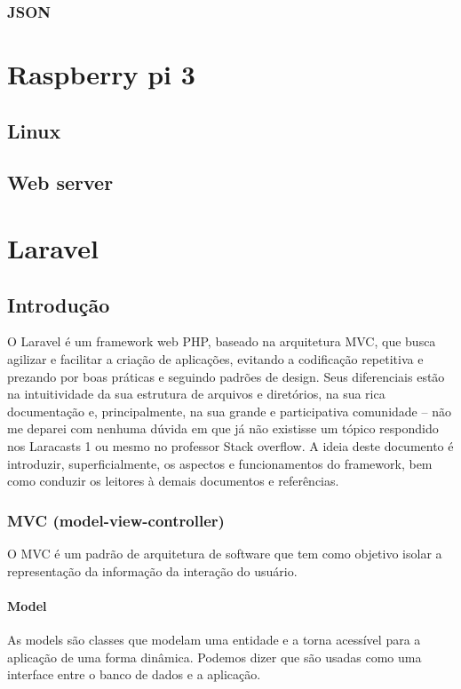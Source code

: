 \documentclass[
12pt,				%
openany,			%
twoside,			%
a4paper,			%
english,			%
french,				%
spanish,			%
brazil,				%
]{abntex2}
\begin{document}
\subsection{JSON}

\chapter{Raspberry pi 3}

\section{Linux}

\section{Web server}



\chapter{Laravel}
\section{Introdução}
O Laravel é um framework web PHP, baseado na arquitetura MVC, que busca agilizar e
facilitar a criação de aplicações, evitando a codificação repetitiva e prezando por boas práticas
e seguindo padrões de design. Seus diferenciais estão na intuitividade da sua estrutura de
arquivos e diretórios, na sua rica documentação e, principalmente, na sua grande e
participativa comunidade – não me deparei com nenhuma dúvida em que já não existisse um
tópico respondido nos Laracasts 1 ou mesmo no professor Stack overflow.
A ideia deste documento é introduzir, superficialmente, os aspectos e funcionamentos do
framework, bem como conduzir os leitores à demais documentos e referências.
\subsection{MVC (model-view-controller)}
O MVC é um padrão de arquitetura de software que tem como objetivo isolar a
representação da informação da interação do usuário.

\subsubsection{Model}
As models são classes que modelam uma entidade e a torna acessível para a aplicação de
uma forma dinâmica. Podemos dizer que são usadas como uma interface entre o banco de
dados e a aplicação.
\end{document}
